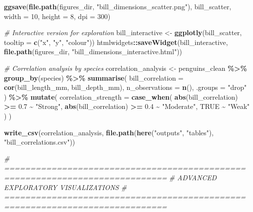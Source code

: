 \documentclass[
]{article}
\newenvironment{Shaded}{\begin{snugshade}}{\end{snugshade}}
\newcommand{\AttributeTok}[1]{\textcolor[rgb]{0.13,0.29,0.53}{#1}}
\newcommand{\CommentTok}[1]{\textcolor[rgb]{0.56,0.35,0.01}{\textit{#1}}}
\newcommand{\ConstantTok}[1]{\textcolor[rgb]{0.56,0.35,0.01}{#1}}
\newcommand{\DecValTok}[1]{\textcolor[rgb]{0.00,0.00,0.81}{#1}}
\newcommand{\FloatTok}[1]{\textcolor[rgb]{0.00,0.00,0.81}{#1}}
\newcommand{\FunctionTok}[1]{\textcolor[rgb]{0.13,0.29,0.53}{\textbf{#1}}}
\newcommand{\NormalTok}[1]{#1}
\newcommand{\OtherTok}[1]{\textcolor[rgb]{0.56,0.35,0.01}{#1}}
\newcommand{\SpecialCharTok}[1]{\textcolor[rgb]{0.81,0.36,0.00}{\textbf{#1}}}
\newcommand{\StringTok}[1]{\textcolor[rgb]{0.31,0.60,0.02}{#1}}
\begin{document}
\begin{Shaded}
\begin{Highlighting}[]
\FunctionTok{ggsave}\NormalTok{(}\FunctionTok{file.path}\NormalTok{(figures\_dir, }\StringTok{"bill\_dimensions\_scatter.png"}\NormalTok{),}
\NormalTok{       bill\_scatter, }\AttributeTok{width =} \DecValTok{10}\NormalTok{, }\AttributeTok{height =} \DecValTok{8}\NormalTok{, }\AttributeTok{dpi =} \DecValTok{300}\NormalTok{)}

\CommentTok{\# Interactive version for exploration}
\NormalTok{bill\_interactive }\OtherTok{\textless{}{-}} \FunctionTok{ggplotly}\NormalTok{(bill\_scatter, }\AttributeTok{tooltip =} \FunctionTok{c}\NormalTok{(}\StringTok{"x"}\NormalTok{, }\StringTok{"y"}\NormalTok{, }\StringTok{"colour"}\NormalTok{))}
\NormalTok{htmlwidgets}\SpecialCharTok{::}\FunctionTok{saveWidget}\NormalTok{(bill\_interactive,}
                       \FunctionTok{file.path}\NormalTok{(figures\_dir, }\StringTok{"bill\_dimensions\_interactive.html"}\NormalTok{))}

\CommentTok{\# Correlation analysis by species}
\NormalTok{correlation\_analysis }\OtherTok{\textless{}{-}}\NormalTok{ penguins\_clean }\SpecialCharTok{\%\textgreater{}\%}
  \FunctionTok{group\_by}\NormalTok{(species) }\SpecialCharTok{\%\textgreater{}\%}
  \FunctionTok{summarise}\NormalTok{(}
    \AttributeTok{bill\_correlation =} \FunctionTok{cor}\NormalTok{(bill\_length\_mm, bill\_depth\_mm),}
    \AttributeTok{n\_observations =} \FunctionTok{n}\NormalTok{(),}
    \AttributeTok{.groups =} \StringTok{"drop"}
\NormalTok{  ) }\SpecialCharTok{\%\textgreater{}\%}
  \FunctionTok{mutate}\NormalTok{(}
    \AttributeTok{correlation\_strength =} \FunctionTok{case\_when}\NormalTok{(}
      \FunctionTok{abs}\NormalTok{(bill\_correlation) }\SpecialCharTok{\textgreater{}=} \FloatTok{0.7} \SpecialCharTok{\textasciitilde{}} \StringTok{"Strong"}\NormalTok{,}
      \FunctionTok{abs}\NormalTok{(bill\_correlation) }\SpecialCharTok{\textgreater{}=} \FloatTok{0.4} \SpecialCharTok{\textasciitilde{}} \StringTok{"Moderate"}\NormalTok{,}
      \ConstantTok{TRUE} \SpecialCharTok{\textasciitilde{}} \StringTok{"Weak"}
\NormalTok{    )}
\NormalTok{  )}

\FunctionTok{write\_csv}\NormalTok{(correlation\_analysis, }\FunctionTok{file.path}\NormalTok{(}\FunctionTok{here}\NormalTok{(}\StringTok{"outputs"}\NormalTok{, }\StringTok{"tables"}\NormalTok{), }\StringTok{"bill\_correlations.csv"}\NormalTok{))}

\CommentTok{\# =============================================================================}
\CommentTok{\# ADVANCED EXPLORATORY VISUALIZATIONS}
\CommentTok{\# =============================================================================}


\end{Highlighting}
\end{Shaded}
\end{document}
